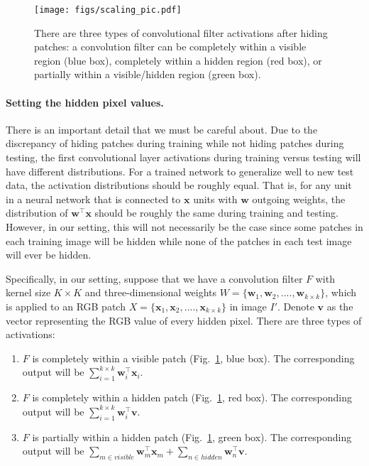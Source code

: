 \documentclass[10pt,twocolumn,letterpaper]{article}
\begin{document}
\begin{figure}[t!]
\centering
    \texttt{[image: figs/scaling\_pic.pdf]}
    \caption{There are three types of convolutional filter activations after hiding patches: a convolution filter can be completely within a visible region (blue box), completely within a hidden region (red box), or partially within a visible/hidden region (green box).}
\label{fig:scaling}
\vspace*{-0.1in}
\end{figure}\vspace{-10pt}\paragraph{Setting the hidden pixel values.}\label{sec:scaling}

There is an important detail that we must be careful about.  Due to the discrepancy of hiding patches during training while not hiding patches during testing, the first convolutional layer activations during training versus testing will have different distributions.  For a trained network to generalize well to new test data, the activation distributions should be roughly equal.  That is, for any unit in a neural network that is connected to $\mathbf{x}$ units with $\mathbf{w}$ outgoing weights, the distribution of $\mathbf{w}^\top\mathbf{x}$ should be roughly the same during training and testing.  However, in our setting, this will not necessarily be the case since some patches in each training image will be hidden while none of the patches in each test image will ever be hidden.


Specifically, in our setting, suppose that we have a convolution filter $F$ with kernel size $K \times K$ and three-dimensional weights $W = \{\mathbf{w}_1,\mathbf{w}_2,....,\mathbf{w}_{k\times k}\}$, which is applied to an RGB patch $X= \{\mathbf{x}_1,\mathbf{x}_2,....,\mathbf{x}_{k \times k}\}$ in image $I'$.  Denote $\mathbf{v}$ as the vector representing the RGB value of every hidden pixel.  There are three types of activations:
\begin{enumerate}
  \item $F$ is completely within a visible patch (Fig.~\ref{fig:scaling}, blue box).  The corresponding output will be $\sum_{i=1}^{k \times k} \mathbf{w}_i^\top \mathbf{x}_i$.
  \item $F$ is completely within a hidden patch (Fig.~\ref{fig:scaling}, red box).  The corresponding output will be $\sum_{i=1}^{k \times k} \mathbf{w}_i^\top \mathbf{v}$.
  \item $F$ is partially within a hidden patch (Fig.~\ref{fig:scaling}, green box).  The corresponding output will be $\sum_{m \in visible} \mathbf{w}_m^\top \mathbf{x}_m + \sum_{n \in hidden} \mathbf{w}_n^\top \mathbf{v}$.
\end{enumerate}
\end{document}

